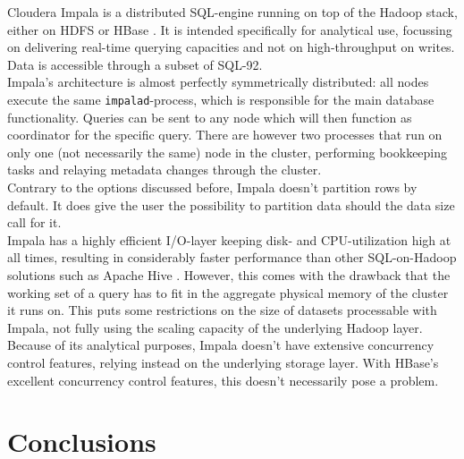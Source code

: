 \documentclass{IEEEtran}
\begin{document}
Cloudera Impala is a distributed SQL-engine running on top of the Hadoop stack, either on HDFS or HBase \cite{cloudera_impala}. It is intended specifically for analytical use, focussing on delivering real-time querying capacities and not on high-throughput on writes.
\\Data is accessible through a subset of SQL-92.
\\Impala's architecture is almost perfectly symmetrically distributed: all nodes execute the same \texttt{impalad}-process, which is responsible for the main database functionality. Queries can be sent to any node which will then function as coordinator for the specific query. There are however two processes that run on only one (not necessarily the same) node in the cluster, performing bookkeeping tasks and relaying metadata changes through the cluster\cite{impala_components}.
\\Contrary to the options discussed before, Impala doesn't partition rows by default. It does give the user the possibility to partition data should the data size call for it\cite{impala_partitioning}.
\\Impala has a highly efficient I/O-layer keeping disk- and CPU-utilization high at all times, resulting in considerably faster performance than other SQL-on-Hadoop solutions such as Apache Hive \cite{floratou2014sql}. However, this comes with the drawback that the working set of a query has to fit in the aggregate physical memory of the cluster it runs on. This puts some restrictions on the size of datasets processable with Impala, not fully using the scaling capacity of the underlying Hadoop layer.
\\Because of its analytical purposes, Impala doesn't have extensive concurrency control features, relying instead on the underlying storage layer. With HBase's excellent concurrency control features, this doesn't necessarily pose a problem.
 
\section{Conclusions}
\end{document}
